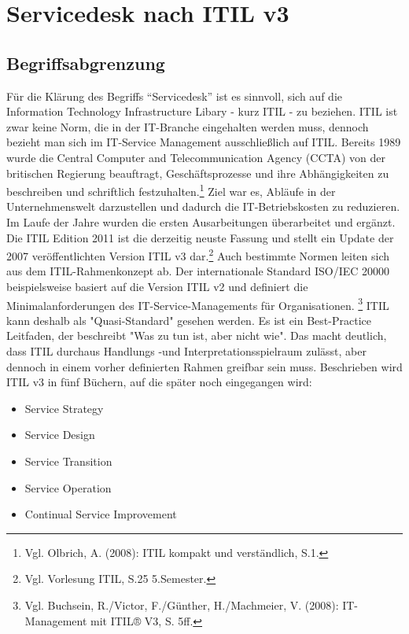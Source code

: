 \section{Servicedesk nach ITIL v3}

\subsection{Begriffsabgrenzung}

\noindent Für die Klärung des Begriffs \enquote{Servicedesk} ist es sinnvoll, sich auf die Information Technology Infrastructure Libary - kurz ITIL - zu beziehen.
ITIL ist zwar keine Norm, die in der IT-Branche eingehalten werden muss, dennoch bezieht man sich im IT-Service Management ausschließlich auf ITIL.
Bereits 1989 wurde die Central Computer and Telecommunication Agency (CCTA) von der britischen Regierung beauftragt, Geschäftsprozesse und ihre Abhängigkeiten zu beschreiben und schriftlich festzuhalten.\footnote{Vgl. Olbrich, A. (2008): ITIL kompakt und verständlich, S.1.}
Ziel war es, Abläufe in der Unternehmenswelt darzustellen und dadurch die IT-Betriebskosten zu reduzieren. Im Laufe der Jahre wurden die ersten Ausarbeitungen überarbeitet und ergänzt. Die ITIL Edition 2011 ist die derzeitig neuste Fassung und stellt ein Update der 2007 veröffentlichten Version ITIL v3 dar.\footnote{Vgl. Vorlesung ITIL, S.25 5.Semester.}
Auch bestimmte Normen leiten sich aus dem ITIL-Rahmenkonzept ab. Der internationale Standard ISO/IEC 20000 beispielsweise basiert auf die Version ITIL v2 und definiert die Minimalanforderungen des IT-Service-Managements für Organisationen. \footnote{Vgl. Buchsein, R./Victor, F./Günther, H./Machmeier, V. (2008): IT-Management mit ITIL® V3, S. 5ff.}
ITIL kann deshalb als "Quasi-Standard" gesehen werden. Es ist ein  Best-Practice Leitfaden, der beschreibt "Was zu tun ist, aber nicht wie". Das macht deutlich, dass ITIL durchaus Handlungs -und Interpretationsspielraum zulässt, aber dennoch in einem vorher definierten Rahmen greifbar sein muss. Beschrieben wird ITIL v3 in fünf Büchern, auf die später noch eingegangen wird:

\begin{itemize}
\item Service Strategy
\item Service Design
\item Service Transition
\item Service Operation
\item Continual Service Improvement
\end{itemize}

